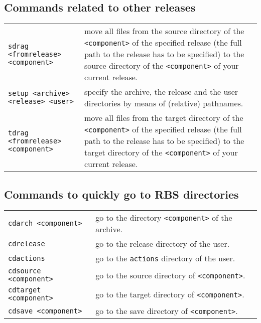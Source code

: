 \subsection{Commands related to other releases}
\begin{tabular}{l p{7.7cm}}
\verb+sdrag <fromrelease> <component>+ & move all files from the source 
                                   directory of 
                               the \verb+<component>+ of the specified release
                                  (the full path to the release has to be
                                  specified) to the source directory of the
                                  \verb+<component>+ of your current release.\\
\verb+setup <archive> <release> <user>+ & 
                                  specify the archive, the release and the
                                  user directories by means of (relative)
                                  pathnames.\\
\verb+tdrag <fromrelease> <component>+ & move all files from the target directory of 
                             the \verb+<component>+ of the specified release
                                  (the full path to the release has to be
                                  specified) to the target directory of the
                             \verb+<component>+ of your current release.\\
\end{tabular}
\subsection{Commands to quickly go to RBS directories}
\begin{tabular}{l p{7.7cm}}
\verb+cdarch <component>+   & go to the directory \verb+<component>+ of the archive. \\  
\verb+cdrelease +   & go to the release directory of the user. \\  
\verb+cdactions +   & go to the \verb+actions+ directory of the user. \\  
\verb+cdsource <component>+   & go to the source directory 
                                of \verb+<component>+. \\
\verb+cdtarget <component>+   & go to the target directory of
                                 \verb+<component>+. \\  
\verb+cdsave <component>+   & go to the save directory of
                                 \verb+<component>+. \\  
\end{tabular}
